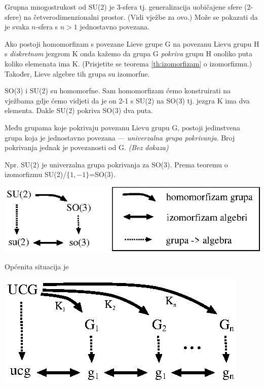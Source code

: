 \begin{primjer}[SU(2)]
Grupna mnogostrukost od SU(2) je 3-sfera tj. generalizacija uobičajene
sfere (2-sfere) na četverodimenzionalni prostor. (Vidi vježbe za ovo.)
Može se pokazati da je svaka $n$-sfera s $n>1$ jednostavno povezana.
\end{primjer}

Ako postoji homomorfizam s povezane Lieve grupe G na povezanu Lievu
grupu H s \emph{diskretnom} jezgrom K onda kažemo da grupa G 
\emph{pokriva} grupu H onoliko puta koliko elemenata ima K.
(Prisjetite se teorema \ref{th:izomorfizam} o izomorfizmu.)
Također, Lieve algebre tih grupa su izomorfne.

\begin{primjer}[SO(3) i SU(2)]
SO(3) i SU(2) su homomorfne. Sam homomorfizam ćemo konstruirati na 
vježbama gdje ćemo vidjeti da je on 2-1 s SU(2) na SO(3) tj. jezgra
K ima dva elementa. Dakle SU(2) pokriva SO(3) dva puta.
\end{primjer}

\begin{teorem}
Među grupama koje pokrivaju povezanu Lievu grupu G, postoji jedinstvena
grupa koja je jednostavno povezana --- \emph{univerzalna grupa pokrivanja}.
Broj pokrivanja jednak je povezanosti od G. \emph{(Bez dokaza)}
\end{teorem}

Npr. SU(2) je univerzalna grupa pokrivanja za SO(3). Prema
teoremu o izomorfizmu  SU(2)/$\{1,-1\}$=SO(3).\\[1ex]

\centerline{\includegraphics[scale=1.0]{pics/so3pokrivanje.eps}}

Općenita situacija je\\[1ex]

\centerline{\includegraphics[scale=1.0]{pics/ucg.eps}}

